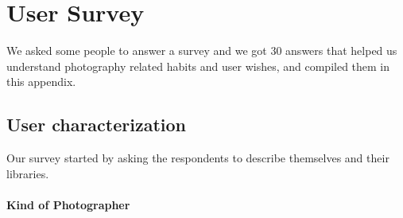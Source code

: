 
\chapter{User Survey}
\label{chapter:appendixVectors}

We asked some people to answer a survey and we got 30 answers that helped us understand photography related habits and user wishes, and compiled them in this appendix.

\section{User characterization}

Our survey started by asking the respondents to describe themselves and their libraries.


\subsubsection{Kind of Photographer} %
\label{ssub:subsubsection_name}


